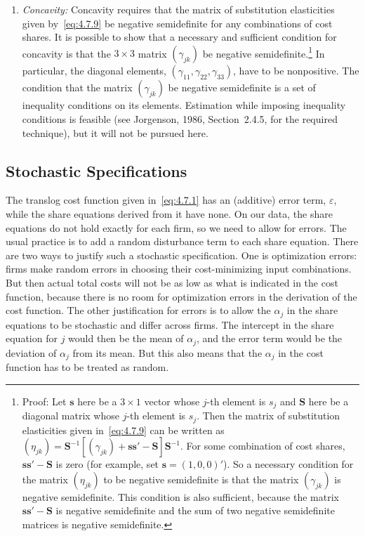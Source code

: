 \begin{enumerate}
\item \textit{Concavity:}\quad
Concavity requires that the matrix of substitution elasticities given
by~\eqref{eq:4.7.9} be negative semidefinite for any combinations of cost shares.
It is possible to show that a necessary and sufficient condition for concavity is that
the $3 \times 3$ matrix $(\gamma_{jk})$ be negative semidefinite.\footnote{Proof:
Let $\mathbf{s}$ here be a $3 \times 1$ vector whose $j$-th element is $s_j$ and
$\mathbf{S}$ here be a diagonal matrix whose $j$-th element is $s_j$.
Then the matrix of substitution elasticities given in~\eqref{eq:4.7.9} can be written
as $(\eta_{jk}) = \mathbf{S}^{-1}[(\gamma_{jk}) + \mathbf{s}\mathbf{s}' -
\mathbf{S}]\mathbf{S}^{-1}$. For some combination of cost shares,
$\mathbf{s}\mathbf{s}' - \mathbf{S}$ is zero (for example, set
$\mathbf{s} = (1, 0, 0)'$). So a necessary condition for the matrix $(\eta_{jk})$
to be negative semidefinite is that the matrix $(\gamma_{jk})$ is negative
semidefinite. This condition is also sufficient, because the matrix
$\mathbf{s}\mathbf{s}' - \mathbf{S}$ is negative semidefinite and the sum of two
negative semidefinite matrices is negative semidefinite.}
In particular, the diagonal elements, $(\gamma_{11}, \gamma_{22}, \gamma_{33})$,
have to be nonpositive. The condition that the matrix $(\gamma_{jk})$ be negative
semidefinite is a set of inequality conditions on its elements.
Estimation while imposing inequality conditions is feasible (see Jorgenson,
1986, Section~2.4.5, for the required technique), but it will not be pursued here.
\end{enumerate}

\subsection*{Stochastic Specifications}

The translog cost function given in~\eqref{eq:4.7.1} has an (additive) error term,
$\varepsilon$, while the share equations derived from it have none. On our data, the
share equations do not hold exactly for each firm, so we need to allow for errors.
The usual practice is to add a random disturbance term to each share equation.
There are two ways to justify such a stochastic specification. One is optimization
errors: firms make random errors in choosing their cost-minimizing input
combinations. But then actual total costs will not be as low as what is indicated
in the cost function, because there is no room for optimization errors in the
derivation of the cost function. The other justification for errors is to allow the
$\alpha_j$ in the share equations to be stochastic and differ across firms.
The intercept in the share equation for $j$ would then be the mean of $\alpha_j$,
and the error term would be the deviation of $\alpha_j$ from its mean. But this
also means that the $\alpha_j$ in the cost function has to be treated as random.

